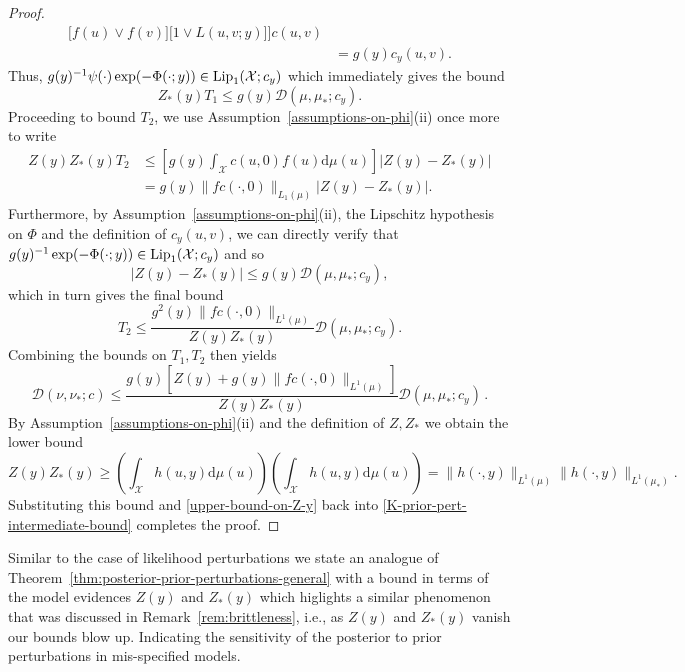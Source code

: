 \documentclass[final]{siamart171218}
\newcommand{\fh}[1]{{\color{blue} #1}}
\newcommand{\mcl}{\mathcal}
\newcommand{\dd}{\text{d}}
\newcommand{\Lip}{{\rm Lip}_1}
\newcommand{\mX}{\mcl{X}}
\newcommand{\cc}{c}
\newcommand{\K}{\mathcal{D}}
\begin{document}
\begin{proof}
\begin{equation*}
\begin{aligned}
      \big[f(u) \vee f(v)\big]
      \big[ 1 \vee L(u,v; y) \big] \bigg] \cc(u,v) \\
      & = g(y) \cc_y(u,v).
    \end{aligned}
  \end{equation*}
  Thus,  $ g(y)^{-1} \psi(\cdot) \exp( - \Phi(\cdot; y)) \in \Lip(\mX; \cc_y)$ which immediately gives the bound
  \begin{equation*}
    Z_\ast(y) T_1 \le g(y) \K( \mu, \mu_\ast; \cc_y).
  \end{equation*}
  Proceeding to bound $T_2$, we  use  Assumption~\ref{assumptions-on-phi}(ii) once more to write
  \begin{equation*}
    \begin{aligned}
      Z(y) Z_\ast(y) T_2
      & \le \left[ g(y)  \int_\mX c(u, 0) f(u) \dd \mu(u)  \right] | Z(y) - Z_\ast(y)| \\
      & =  g(y)\| f c(\cdot, 0) \|_{L_1(\mu)} | Z(y) - Z_\ast(y)|.
  \end{aligned}
\end{equation*}
Furthermore, by  Assumption~\ref{assumptions-on-phi}(ii), the Lipschitz hypothesis on $\Phi$ and
the definition of  $c_y(u,v)$, we can directly verify that $ g(y)^{-1} \exp( - \Phi(\cdot;y) ) \in \Lip(\mX; \cc_y)$
and so
\begin{equation*}
  | Z(y) - Z_\ast(y) | \le g(y) \K( \mu, \mu_\ast ; \cc_y),
\end{equation*}
which in turn gives the final bound
\begin{equation*}
  T_2 \le \frac{ g^2(y) \| f c( \cdot, 0 ) \|_{L^1(\mu)}}{Z(y) Z_\ast(y)} \K( \mu, \mu_\ast ; \cc_y).
\end{equation*}
  Combining the bounds on $T_1, T_2$ then yields
\begin{equation}\label{K-prior-pert-intermediate-bound}
  \K(\nu, \nu_\ast; c) \le
  \frac{g(y) \left[  Z(y) + g(y) \| f c(\cdot, 0) \|_{L^1(\mu)} \right] }{Z(y) Z_\ast(y)} 
  \K(\mu, \mu_\ast; c_y)\,.
\end{equation}
By Assumption~\ref{assumptions-on-phi}(ii) and the definition of $Z, Z_\ast$ we obtain the lower bound
\begin{equation*}
  Z(y) Z_\ast(y) \ge \left( \int_{\mX} h(u,y) \dd \mu(u) \right) \left( \int_{\mX} h(u,y) \dd \mu(u) \right)
  = \| h(\cdot, y) \|_{L^1(\mu)} \| h(\cdot, y) \|_{L^1(\mu_\ast)}.
\end{equation*}
Substituting this bound and \eqref{upper-bound-on-Z-y} back into \eqref{K-prior-pert-intermediate-bound}
completes the proof.
\end{proof}
Similar to the case of likelihood perturbations we
 state an analogue of Theorem~\ref{thm:posterior-prior-perturbations-general} 
with a bound in terms of the model evidences $Z(y)$ and $Z_\ast(y)$ which higlights 
a similar phenomenon that was discussed in Remark~\ref{rem:brittleness}, i.e., 
as $Z(y)$ and $Z_\ast(y)$ vanish our bounds blow up. Indicating the sensitivity of the 
posterior to prior perturbations in mis-specified models.
\end{document}

